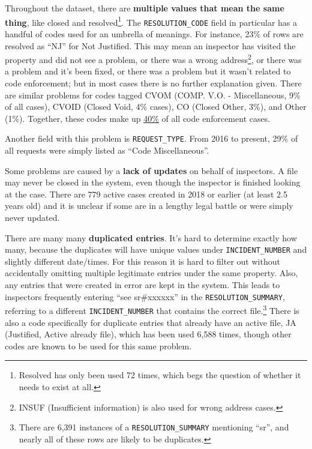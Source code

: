 \documentclass[
]{book}
\begin{document}
Throughout the dataset, there are \textbf{multiple values that mean the same thing}, like closed and resolved\footnote{Resolved has only been used 72 times, which begs the question of whether it needs to exist at all.}. The \texttt{RESOLUTION\_CODE} field in particular has a handful of codes used for an umbrella of meanings. For instance, 23\% of rows are resolved as ``NJ'' for Not Justified. This may mean an inspector has visited the property and did not see a problem, or there was a wrong address\footnote{INSUF (Insufficient information) is also used for wrong address cases.}, or there was a problem and it's been fixed, or there was a problem but it wasn't related to code enforcement; but in most cases there is no further explanation given. There are similar problems for codes tagged CVOM (COMP. V.O. - Miscellaneous, 9\% of all cases), CVOID (Closed Void, 4\% cases), CO (Closed Other, 3\%), and Other (1\%). Together, these codes make up \underline{40\%} of all code enforcement cases.

Another field with this problem is \texttt{REQUEST\_TYPE}. From 2016 to present, 29\% of all requests were simply listed as ``Code Miscellaneous''.

Some problems are caused by a \textbf{lack of updates} on behalf of inspectors. A file may never be closed in the system, even though the inspector is finished looking at the case. There are 779 active cases created in 2018 or earlier (at least 2.5 years old) and it is unclear if some are in a lengthy legal battle or were simply never updated.

There are many many \textbf{duplicated entries}. It's hard to determine exactly how many, because the duplicates will have unique values under \texttt{INCIDENT\_NUMBER} and slightly different date/times. For this reason it is hard to filter out without accidentally omitting multiple legitimate entries under the same property. Also, any entries that were created in error are kept in the system. This leads to inspectors frequently entering ``see sr\#xxxxxx'' in the \texttt{RESOLUTION\_SUMMARY}, referring to a different \texttt{INCIDENT\_NUMBER} that contains the correct file.\footnote{There are 6,391 instances of a \texttt{RESOLUTION\_SUMMARY} mentioning ``sr'', and nearly all of these rows are likely to be duplicates.} There is also a code specifically for duplicate entries that already have an active file, JA (Justified, Active already file), which has been used 6,588 times, though other codes are known to be used for this same problem.
\end{document}
